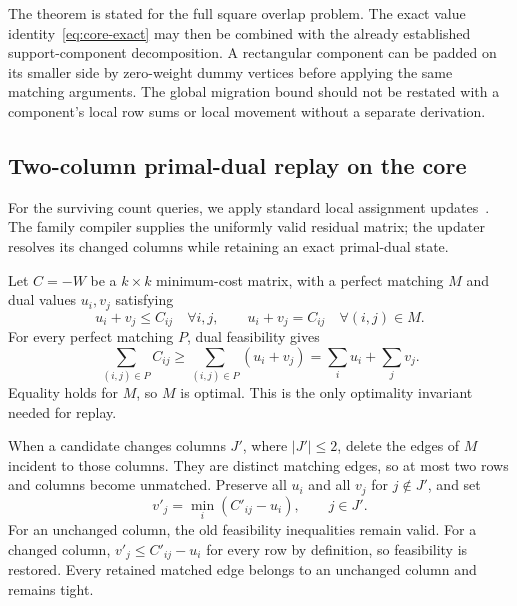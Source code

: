 \documentclass[11pt]{article}
\begin{document}
The theorem is stated for the full square overlap problem. The exact value identity~\eqref{eq:core-exact} may then be combined with the already established support-component decomposition. A rectangular component can be padded on its smaller side by zero-weight dummy vertices before applying the same matching arguments. The global migration bound should not be restated with a component's local row sums or local movement without a separate derivation.

\subsection{Two-column primal-dual replay on the core}
For the surviving count queries, we apply standard local assignment updates~\cite{millstettey2007dynamic,morita2024update}. The family compiler supplies the uniformly valid residual matrix; the updater resolves its changed columns while retaining an exact primal-dual state.

Let $C=-W$ be a $k\times k$ minimum-cost matrix, with a perfect matching $M$ and dual values $u_i,v_j$ satisfying
\begin{equation}\label{eq:core-dual-state}
u_i+v_j\le C_{ij}\quad\forall i,j,\qquad u_i+v_j=C_{ij}\quad\forall(i,j)\in M.
\end{equation}
For every perfect matching $P$, dual feasibility gives
\begin{equation}
\sum_{(i,j)\in P}C_{ij}\ge\sum_{(i,j)\in P}(u_i+v_j)=\sum_i u_i+\sum_j v_j.
\end{equation}
Equality holds for $M$, so $M$ is optimal. This is the only optimality invariant needed for replay.

When a candidate changes columns $J'$, where $|J'|\le2$, delete the edges of $M$ incident to those columns. They are distinct matching edges, so at most two rows and columns become unmatched. Preserve all $u_i$ and all $v_j$ for $j\notin J'$, and set
\begin{equation}\label{eq:core-dual-reset}
v'_j=\min_i(C'_{ij}-u_i),\qquad j\in J'.
\end{equation}
For an unchanged column, the old feasibility inequalities remain valid. For a changed column, $v'_j\le C'_{ij}-u_i$ for every row by definition, so feasibility is restored. Every retained matched edge belongs to an unchanged column and remains tight.
\end{document}
